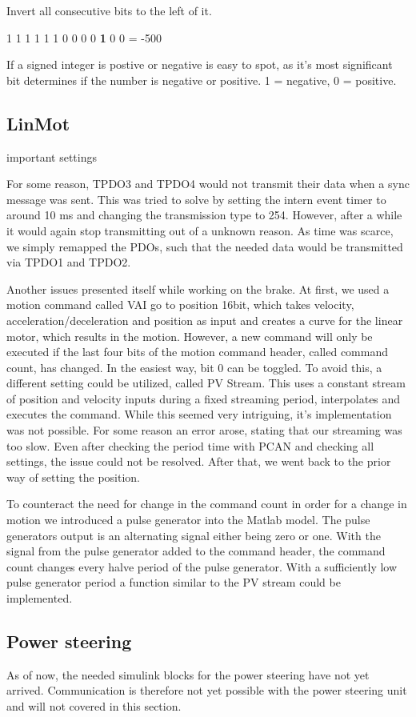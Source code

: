 Invert all consecutive bits to the left of it.

1 1 1 1  1 1 0  0 0 0  \textbf{1} 0 0 = -500

If a signed integer is postive or negative is easy to spot, as it's most significant bit determines if the number is negative or positive. 1 = negative, 0 = positive.

\subsection{LinMot}
important settings

For some reason, TPDO3 and TPDO4 would not transmit their data when a sync message was sent. This was tried to solve by setting the intern event timer to around 10 ms and changing the transmission type to 254. However, after a while it would again stop transmitting out of a unknown reason. As time was scarce, we simply remapped the PDOs, such that the needed data would be transmitted via TPDO1 and TPDO2. 


Another issues presented itself while working on the brake. At first, we used a motion command called VAI go to position 16bit, which takes velocity, acceleration/deceleration and position as input and creates a curve for the linear motor, which results in the motion. However, a new command will only be executed if the last four bits of the motion command header, called command count, has changed. In the easiest way, bit 0 can be toggled. 
To avoid this, a different setting could be utilized, called PV Stream. This uses a constant stream of position and velocity inputs during a fixed streaming period, interpolates and executes the command. While this seemed very intriguing, it's implementation was not possible. For some reason an error arose, stating that our streaming was too slow. Even after checking the period time with PCAN and checking all settings, the issue could not be resolved.
After that, we went back to the prior way of setting the position.

To counteract the need for change in the command count in order for a change in motion we introduced a pulse generator into the Matlab model.
The pulse generators output is an alternating signal either being zero or one. With the signal from the pulse generator added to the command header, the command count changes every halve period of the pulse generator. With a sufficiently low pulse generator period a function similar to the PV stream could be implemented.

\subsection{Power steering}

As of now, the needed simulink blocks for the power steering have not yet arrived. Communication is therefore not yet possible with the power steering unit and will not covered in this section.



